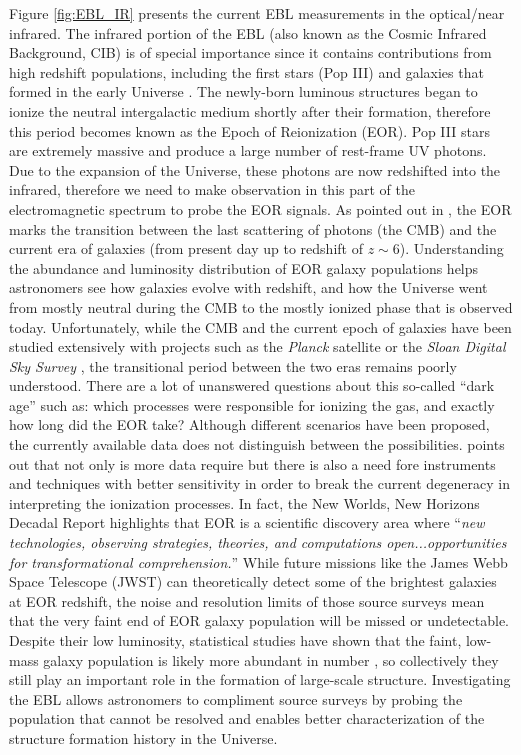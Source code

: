 Figure \ref{fig:EBL_IR} presents the current EBL measurements in the optical/near infrared. 
The infrared portion of the EBL (also known as the Cosmic Infrared Background, CIB) is of special importance since it contains contributions from high redshift populations, including the first stars (Pop III) and galaxies that formed in the early Universe \citep{Madau2005, Kashlinsky2005}. The newly-born luminous structures began to ionize the neutral intergalactic medium shortly after their formation, therefore this period becomes known as the Epoch of Reionization (EOR).
Pop III stars are extremely massive and produce a large number of rest-frame UV photons. Due to the expansion of the Universe, these photons are now redshifted into the infrared, therefore we need to make observation in this part of the electromagnetic spectrum to probe the EOR signals. 
As pointed out in \citet{Fan2006b}, the EOR marks the transition between the last scattering of photons (the CMB) and the current era of galaxies (from present day up to redshift of $z \sim 6$). Understanding the abundance and luminosity distribution of EOR galaxy populations helps astronomers see how galaxies evolve with redshift, and how the Universe went from mostly neutral during the CMB to the mostly ionized phase that is observed today. Unfortunately, while the CMB and the current epoch of galaxies have been studied extensively with projects such as the \textit{Planck} satellite \citep{Planck2011} or the \textit{Sloan Digital Sky Survey} \citep{Sloan2006_telescope, Sloan_SDSS-I, Sloan_SEGUE, Sloan_SDSS-II, Sloan_SDSS-III, Sloan_SDSS-IV}, the transitional period between the two eras remains poorly understood. There are a lot of unanswered questions about this so-called ``dark age'' such as: which processes were responsible for ionizing the gas, and exactly how long did the EOR take? Although different scenarios have been proposed, the currently available data does not distinguish between the possibilities. \citet{Salvaterra2009} points out that not only is more data require but there is also a need fore instruments and techniques with better sensitivity in order to break the current degeneracy in interpreting the ionization processes.
In fact, the New Worlds, New Horizons Decadal Report \citep{Decadal2010} highlights that EOR is a scientific discovery area where ``\emph{new technologies, observing strategies, theories, and computations open...opportunities for transformational comprehension.}''
While future missions like the James Webb Space Telescope (JWST) can theoretically detect some of the brightest galaxies at EOR redshift, the noise and resolution limits of those source surveys mean that the very faint end of EOR galaxy population will be missed or undetectable. Despite their low luminosity, statistical studies have shown that the faint, low-mass galaxy population is likely more abundant in number \citep{Conselice2016}, so collectively they still play an important role in the formation of large-scale structure. Investigating the EBL allows astronomers to compliment source surveys by probing the population that cannot be resolved and enables better characterization of the structure formation history in the Universe. 



